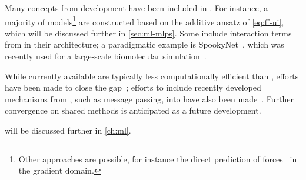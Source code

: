 Many concepts from \ff development have been included in \mlps. For instance, a majority of models\footnote{Other approaches are possible, for instance the direct prediction of forces~\cite{ctsm2017q,csmt2018q,csmt2019q} in the gradient domain.} are constructed based on the additive ansatz of \cref{eq:ff-ui}, which will be discussed further in \cref{sec:ml-mlps}. Some \mlps include interaction terms from \ffs in their architecture; a paradigmatic example is SpookyNet~\cite{ucsm2021q}, which was recently used for a large-scale biomolecular simulation~\cite{ustm2022a}.

While currently available \mlps are typically less computationally efficient than \ffs, efforts have been made to close the gap~\cite{xrh2021a,jxvk2022a,pomk2023q}; efforts to include recently developed mechanisms from \mlps, such as message passing, into \ffs have also been made~\cite{xgzw2021q}. Further convergence on shared methods is anticipated as a future development.

\mlps will be discussed further in \cref{ch:ml}.
